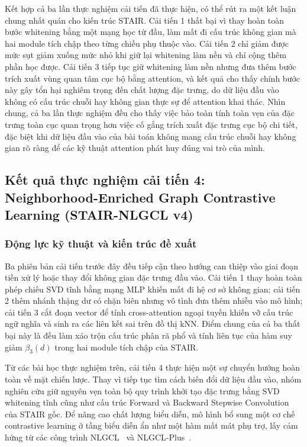 Kết hợp cả ba lần thực nghiệm cải tiến đã thực hiện, có thể rút ra một kết luận chung nhất quán cho kiến trúc STAIR. Cải tiến 1 thất bại vì thay hoàn toàn bước whitening bằng một mạng học từ đầu, làm mất đi cấu trúc không gian mà hai module tích chập theo từng chiều phụ thuộc vào. Cải tiến 2 chỉ giảm được mức sụt giảm xuống mức nhỏ khi giữ lại whitening làm nền và chỉ cộng thêm phần học được. Cải tiến 3 tiếp tục giữ whitening làm nền nhưng đưa thêm bước trích xuất vùng quan tâm cục bộ bằng attention, và kết quả cho thấy chính bước này gây tổn hại nghiêm trọng đến chất lượng đặc trưng, do dữ liệu đầu vào không có cấu trúc chuỗi hay không gian thực sự để attention khai thác. Nhìn chung, cả ba lần thực nghiệm đều cho thấy việc bảo toàn tính toàn vẹn của đặc trưng toàn cục quan trọng hơn việc cố gắng trích xuất đặc trưng cục bộ chi tiết, đặc biệt khi dữ liệu đầu vào của bài toán không mang cấu trúc chuỗi hay không gian rõ ràng để các kỹ thuật attention phát huy đúng vai trò của mình.


\subsection{Kết quả thực nghiệm cải tiến 4: Neighborhood-Enriched Graph Contrastive Learning (STAIR-NLGCL v4)}

\subsubsection{Động lực kỹ thuật và kiến trúc đề xuất}

Ba phiên bản cải tiến trước đây đều tiếp cận theo hướng can thiệp vào giai đoạn tiền xử lý hoặc thay đổi không gian đặc trưng đầu vào. Cải tiến 1 thay hoàn toàn phép chiếu SVD tĩnh bằng mạng MLP khiến mất đi hệ cơ sở không gian; cải tiến 2 thêm nhánh thặng dư có chặn biên nhưng vô tình đưa thêm nhiễu vào mô hình; cải tiến 3 cắt đoạn vector để tính cross-attention ngoại tuyến khiến vỡ cấu trúc ngữ nghĩa và sinh ra các liên kết sai trên đồ thị kNN. Điểm chung của cả ba thất bại này là đều làm xáo trộn cấu trúc phân rã phổ và tính liên tục của hàm suy giảm $\beta_3(d)$ trong hai module tích chập của STAIR.

Từ các bài học thực nghiệm trên, cải tiến 4 thực hiện một sự chuyển hướng hoàn toàn về mặt chiến lược. Thay vì tiếp tục tìm cách biến đổi dữ liệu đầu vào, nhóm nghiên cứu giữ nguyên vẹn toàn bộ quy trình khởi tạo đặc trưng bằng SVD whitening tĩnh cũng như cấu trúc Forward và Backward Stepwise Convolution của STAIR gốc. Để nâng cao chất lượng biểu diễn, mô hình bổ sung một cơ chế contrastive learning ở tầng biểu diễn ẩn như một hàm mất mát phụ trợ, lấy cảm hứng từ các công trình NLGCL~\cite{xu2024nlgcl} và NLGCL-Plus~\cite{xu2024nlgclplus}.

